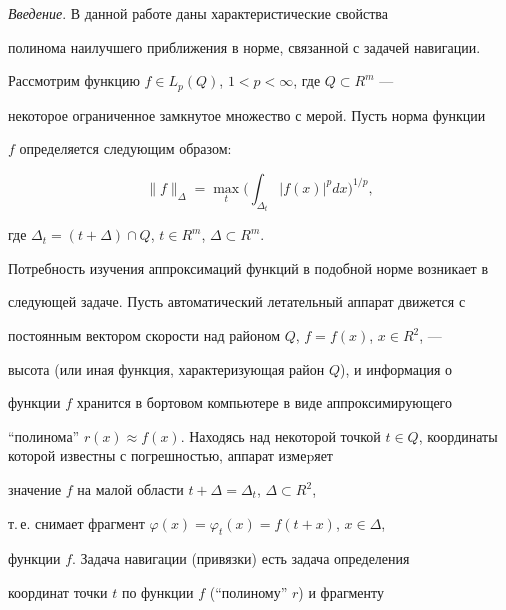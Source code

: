\maketitle 


\label{begin} 


 


{\it Введение}. В данной работе даны характеристические свойства 


полинома наилучшего приближения в норме, связанной с задачей навигации. 


Рассмотрим функцию $f\in L_p(Q)$, $1<p<\infty$, где $Q\subset R^m$ --- 


некоторое ограниченное замкнутое множество с мерой. Пусть норма функции 


$f$ определяется следующим образом: 


\begin{equation} 


\|f\|_\Delta=\max_t\bigg(\int_{\Delta_t} 


|f(x)|^pdx \bigg)^{1/p}, 


\end{equation} 


где $\Delta_t=(t+\Delta)\cap Q$, $t\in R^m$, $\Delta\subset R^m$. 


 


Потребность изучения аппроксимаций функций в подобной норме возникает в 


следующей задаче. Пусть автоматический летательный аппарат движется с 


постоянным вектором скорости над районом $Q$, $f=f(x)$, $x\in R^2$, --- 


высота (или иная функция, характеризующая район $Q$), и информация о 


функции $f$ хранится в бортовом компьютере в виде аппроксимирующего 


``полинома'' $r(x)\approx f(x)$. Находясь над некоторой точкой $t\in 


Q$, координаты которой известны с погрешностью, аппарат измеpяет 


значение $f$ на малой области $t+\Delta=\Delta_t$, $\Delta\subset R^2$, 


т.\,е. снимает фрагмент $\varphi(x)=\varphi_t(x)=f(t+x)$, $x\in\Delta$, 


функции $f$. Задача навигации (привязки) есть задача определения 


координат точки $t$ по функции $f$ (``полиному'' $r$) и фрагменту 


